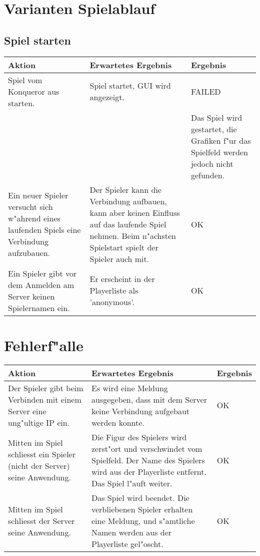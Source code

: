 \section{Varianten Spielablauf}

\subsection{Spiel starten}

\begin{tabular}{|p{50mm}|p{70mm}|p{20mm}|}
\hline
\textbf{Aktion} & \textbf{Erwartetes Ergebnis} & \textbf{Ergebnis}  \\
\hline
Spiel vom Konqueror aus starten.  &
Spiel startet, GUI wird angezeigt.  &
FAILED   \\
 & & Das Spiel wird gestartet, die Grafiken f"ur das Spielfeld werden jedoch nicht gefunden. \\
\hline
Ein neuer Spieler versucht sich w"ahrend eines laufenden Spiels eine Verbindung aufzubauen.  &
Der Spieler kann die Verbindung aufbauen, kann aber keinen Einfluss auf das laufende Spiel nehmen.
  Beim n"achsten Spielstart spielt der Spieler auch mit.  &
OK  \\
\hline
Ein Spieler gibt vor dem Anmelden am Server keinen Spielernamen ein.  &
Er erscheint in der Playerliste als 'anonymous'.  &
OK  \\
\hline

\end{tabular}


\section{Fehlerf"alle}

\begin{tabular}{|p{50mm}|p{70mm}|p{20mm}|}
\hline
\textbf{Aktion} & \textbf{Erwartetes Ergebnis} & \textbf{Ergebnis}  \\
\hline
Der Spieler gibt beim Verbinden mit einem Server eine ung"ultige IP ein. &
Es wird eine Meldung ausgegeben, dass mit dem Server keine Verbindung aufgebaut werden konnte.  &
OK  \\
\hline
Mitten im Spiel schliesst ein Spieler (nicht der Server) seine Anwendung.  &
Die Figur des Spielers wird zerst"ort und verschwindet vom Spielfeld. Der Name des Spielers wird aus der
  Playerliste entfernt. Das Spiel l"auft weiter.  &
OK \\
\hline
Mitten im Spiel schliesst der Server seine Anwendung.  &
Das Spiel wird beendet. Die verbliebenen Spieler erhalten eine Meldung, und s"amtliche Namen werden aus
  der Playerliste gel"oscht.  &
OK \\
\hline
\end{tabular}


